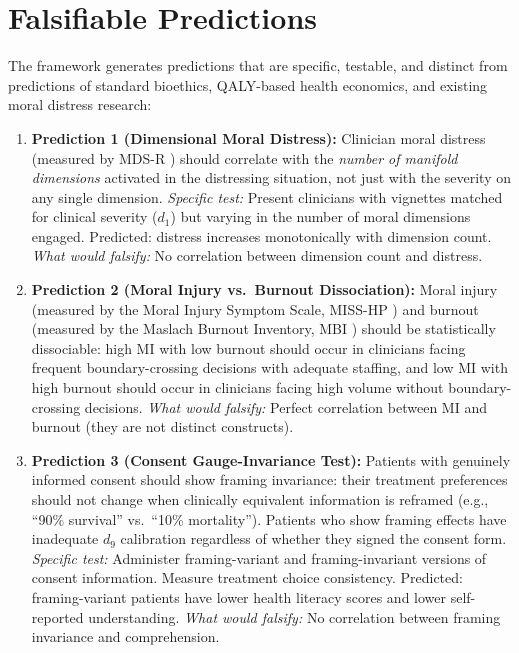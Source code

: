 \documentclass[12pt]{article}
\theoremstyle{definition}
\theoremstyle{remark}
\begin{document}
\section{Falsifiable Predictions}
\label{sec:predictions}

The framework generates predictions that are specific, testable, and distinct from predictions of standard bioethics, QALY-based health economics, and existing moral distress research:

\begin{enumerate}
    \item \textbf{Prediction 1 (Dimensional Moral Distress):} Clinician moral distress (measured by MDS-R \cite{hamric2012}) should correlate with the \emph{number of manifold dimensions} activated in the distressing situation, not just with the severity on any single dimension.  \emph{Specific test:} Present clinicians with vignettes matched for clinical severity ($d_1$) but varying in the number of moral dimensions engaged.  Predicted: distress increases monotonically with dimension count.  \emph{What would falsify:} No correlation between dimension count and distress.

    \item \textbf{Prediction 2 (Moral Injury vs.\ Burnout Dissociation):} Moral injury (measured by the Moral Injury Symptom Scale, MISS-HP \cite{zhizhong2019}) and burnout (measured by the Maslach Burnout Inventory, MBI \cite{maslach1981}) should be statistically dissociable: high MI with low burnout should occur in clinicians facing frequent boundary-crossing decisions with adequate staffing, and low MI with high burnout should occur in clinicians facing high volume without boundary-crossing decisions.  \emph{What would falsify:} Perfect correlation between MI and burnout (they are not distinct constructs).

    \item \textbf{Prediction 3 (Consent Gauge-Invariance Test):} Patients with genuinely informed consent should show framing invariance: their treatment preferences should not change when clinically equivalent information is reframed (e.g., ``90\% survival'' vs.\ ``10\% mortality'').  Patients who show framing effects have inadequate $d_9$ calibration regardless of whether they signed the consent form.  \emph{Specific test:} Administer framing-variant and framing-invariant versions of consent information.  Measure treatment choice consistency.  Predicted: framing-variant patients have lower health literacy scores and lower self-reported understanding.  \emph{What would falsify:} No correlation between framing invariance and comprehension.


\end{enumerate}
\end{document}
